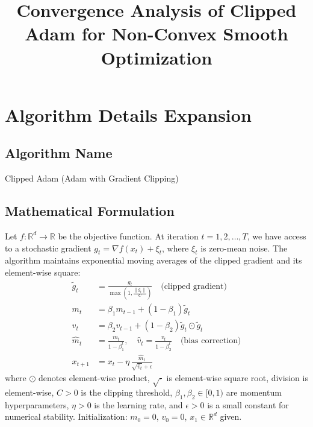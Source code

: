 \documentclass{article}
\title{Convergence Analysis of Clipped Adam for Non-Convex Smooth Optimization}
\author{}
\date{}
\newcommand{\R}{\mathbb{R}}
\newcommand{\norm}[1]{\left\| #1 \right\|}
\begin{document}
\maketitle

\section*{Algorithm Details Expansion}

\subsection*{Algorithm Name}
Clipped Adam (Adam with Gradient Clipping)

\subsection*{Mathematical Formulation}
Let $f: \R^d \to \R$ be the objective function. At iteration $t = 1, 2, \dots, T$, we have access to a stochastic gradient $g_t = \nabla f(x_t) + \xi_t$, where $\xi_t$ is zero-mean noise. The algorithm maintains exponential moving averages of the clipped gradient and its element-wise square:
\begin{align}
    \tilde{g}_t &= \frac{g_t}{\max\left(1, \frac{\norm{g_t}}{C}\right)} \quad \text{(clipped gradient)} \\
    m_t &= \beta_1 m_{t-1} + (1-\beta_1) \tilde{g}_t \\
    v_t &= \beta_2 v_{t-1} + (1-\beta_2) \tilde{g}_t \odot \tilde{g}_t \\
    \hat{m}_t &= \frac{m_t}{1-\beta_1^t}, \quad \hat{v}_t = \frac{v_t}{1-\beta_2^t} \quad \text{(bias correction)} \\
    x_{t+1} &= x_t - \eta \, \frac{\hat{m}_t}{\sqrt{\hat{v}_t} + \epsilon}
\end{align}
where $\odot$ denotes element-wise product, $\sqrt{\cdot}$ is element-wise square root, division is element-wise, $C > 0$ is the clipping threshold, $\beta_1, \beta_2 \in [0,1)$ are momentum hyperparameters, $\eta > 0$ is the learning rate, and $\epsilon > 0$ is a small constant for numerical stability. Initialization: $m_0 = 0$, $v_0 = 0$, $x_1 \in \R^d$ given.
\end{document}
